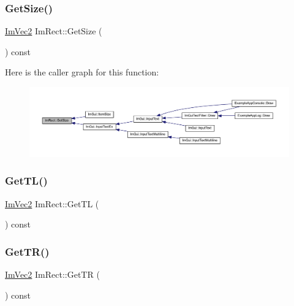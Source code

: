 \subsubsection{\texorpdfstring{Get\+Size()}{GetSize()}}
{\footnotesize\ttfamily \mbox{\hyperlink{struct_im_vec2}{Im\+Vec2}} Im\+Rect\+::\+Get\+Size (\begin{DoxyParamCaption}{ }\end{DoxyParamCaption}) const\hspace{0.3cm}{\ttfamily [inline]}}

Here is the caller graph for this function\+:
\nopagebreak
\begin{figure}[H]
\begin{center}
\leavevmode
\includegraphics[width=350pt]{struct_im_rect_ae459d9c50003058cfb34519a571aaf33_icgraph}
\end{center}
\end{figure}
\mbox{\label{struct_im_rect_a1d4d972329722b51dca4499cb5931b4b}} 
\subsubsection{\texorpdfstring{Get\+T\+L()}{GetTL()}}
{\footnotesize\ttfamily \mbox{\hyperlink{struct_im_vec2}{Im\+Vec2}} Im\+Rect\+::\+Get\+TL (\begin{DoxyParamCaption}{ }\end{DoxyParamCaption}) const\hspace{0.3cm}{\ttfamily [inline]}}

\mbox{\label{struct_im_rect_acae90248a96be4acf1524071fca1c3f3}} 
\subsubsection{\texorpdfstring{Get\+T\+R()}{GetTR()}}
{\footnotesize\ttfamily \mbox{\hyperlink{struct_im_vec2}{Im\+Vec2}} Im\+Rect\+::\+Get\+TR (\begin{DoxyParamCaption}{ }\end{DoxyParamCaption}) const\hspace{0.3cm}{\ttfamily [inline]}}

